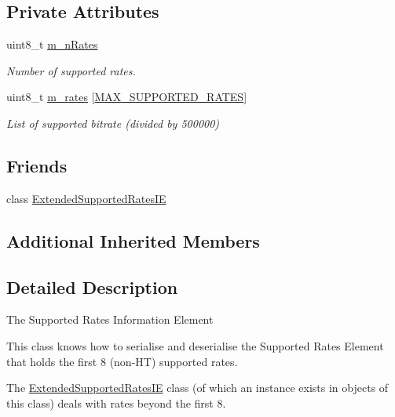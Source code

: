 \subsection*{Private Attributes}
\begin{DoxyCompactItemize}
\item 
uint8\+\_\+t \hyperlink{classns3_1_1SupportedRates_a48bc8bd88b3c7abae9fcd75fd40c4279}{m\+\_\+n\+Rates}
\begin{DoxyCompactList}\small\item\em Number of supported rates. \end{DoxyCompactList}\item 
uint8\+\_\+t \hyperlink{classns3_1_1SupportedRates_a4b17159f12e29a88e82b8a92507e4884}{m\+\_\+rates} \mbox{[}\hyperlink{classns3_1_1SupportedRates_ac9bc5778c688e7b70f17dc4536de3922}{M\+A\+X\+\_\+\+S\+U\+P\+P\+O\+R\+T\+E\+D\+\_\+\+R\+A\+T\+ES}\mbox{]}
\begin{DoxyCompactList}\small\item\em List of supported bitrate (divided by 500000) \end{DoxyCompactList}\end{DoxyCompactItemize}
\subsection*{Friends}
\begin{DoxyCompactItemize}
\item 
class \hyperlink{classns3_1_1SupportedRates_ac4af3e8b73361f2e64c62e41011c7517}{Extended\+Supported\+Rates\+IE}
\end{DoxyCompactItemize}
\subsection*{Additional Inherited Members}


\subsection{Detailed Description}
The Supported Rates Information Element

This class knows how to serialise and deserialise the Supported Rates Element that holds the first 8 (non-\/\+HT) supported rates. 

The {\ttfamily \hyperlink{classns3_1_1ExtendedSupportedRatesIE}{Extended\+Supported\+Rates\+IE}} class (of which an instance exists in objects of this class) deals with rates beyond the first 8. 

